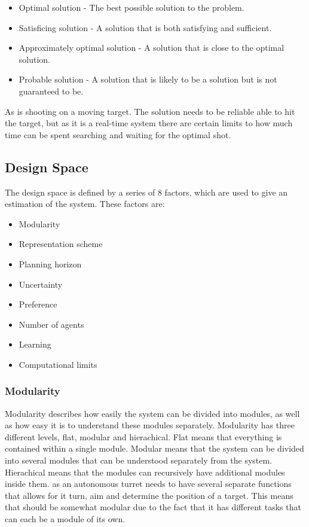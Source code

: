 \begin{itemize}
  \item Optimal solution - The best possible solution to the problem.
  \item Satisficing solution - A solution that is both satisfying and
  sufficient.
  \item Approximately optimal solution - A solution that is close to the optimal
  solution.
  \item Probable solution - A solution that is likely to be a solution but is
  not guaranteed to be.
\end{itemize}

As \name is shooting on a moving target. The solution needs to be reliable able
to hit the target, but as it is a real-time system there are certain limits to
how much time can be spent searching and waiting for the optimal shot.


\subsection{Design Space}
The design space is defined by a series of 8 factors, which are used to give an
estimation of the system. These factors are:

\begin{itemize}
   \item Modularity
   \item Representation scheme
   \item Planning horizon
   \item Uncertainty
   \item Preference
   \item Number of agents
   \item Learning
   \item Computational limits
\end{itemize}

\subsubsection{Modularity}
Modularity describes how easily the system can be divided into modules, as well
as how easy it is to understand these modules separately. Modularity has three
different levels, flat, modular and hierachical. Flat means that everything is
contained within a single module. Modular means that the system can be divided
into several modules that can be understood separately from the system.
Hierachical means that the modules can recursively have additional modules
inside them. \name as an autonomous turret needs to have several separate
functions that allows for it turn, aim and determine the position of a target.
This means that \name should be somewhat modular due to the fact that it has
different tasks that can each be a module of its own.

